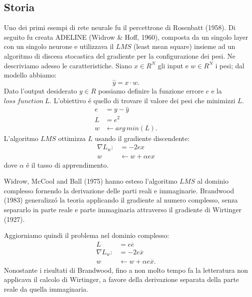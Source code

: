 \documentclass[a4paper,10pt]{article}
\begin{document}
 
 \subsection{Storia}
 Uno dei primi esempi di rete neurale fu il percettrone di Rosenbatt (1958). Di seguito fu creata ADELINE (Widrow \& Hoff, 1960), composta da un singolo layer con un singolo neurone e utilizzava il $LMS$ (least mean square) insieme ad un algoritmo di discesa stocastica del gradiente per la configurazione dei pesi. Ne descriviamo adesso le caratteristiche. Siano $x \in R^N$ gli input e $w \in R^N$ i pesi; dal modello abbiamo:
 \begin{equation}
  \widehat{y} = x \cdot w.
 \end{equation}
 Dato l'output desiderato $y \in R$ possiamo definire la funzione errore $e$ e la $loss \ function \ L$. L'obiettivo \'e quello di trovare il valore dei pesi che minimizzi $L$.
 \begin{align}
  e &= y - \widehat{y}\\
  L &= e^2\\
  w &\leftarrow arg \, min(L).
 \end{align}
 L'algoritmo $LMS$ ottimizza $L$ usando il gradiente discendente:
 \begin{align}
  \nabla L_w: &= -2ex\\
  w &\leftarrow w + \alpha ex
 \end{align}
 dove $\alpha$ \'e il tasso di apprendimento. 

 Widrow, McCool and Ball (1975) hanno esteso l'algoritmo $LMS$ al dominio complesso fornendo la derivazione delle parti reali e immaginarie. Brandwood (1983) generalizz\'o la teoria applicando il gradiente al numero complesso, senza separarlo in parte reale e parte immaginaria attraverso il gradiente di Wirtinger (1927). 

 Aggiorniamo quindi il problema nel dominio complesso:
 \begin{align}
  L &= e \overline{e}\\
  \nabla L_w : &= -2e\overline{x}\\
  w &\leftarrow w + \alpha e \overline{x}.
 \end{align}
 Nonostante i risultati di Brandwood, fino a non molto tempo fa la letteratura non applicava il calcolo di Wirtinger, a favore della derivazione separata della parte reale da quella immaginaria. 
 
\end{document}
